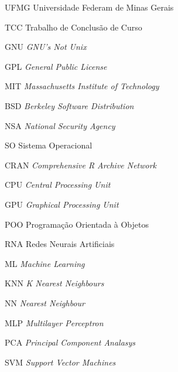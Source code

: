 


\begin{siglas}
	\item[UFMG] Universidade Federam de Minas Gerais
	\item[TCC] Trabalho de Conclusão de Curso
	
	\item[GNU] \textit{GNU's Not Unix}
	\item[GPL] \textit{General Public License }
	\item[MIT] \textit{ Massachusetts Institute of Technology }
	\item[BSD] \textit{Berkeley Software Distribution}
	\item[NSA] \textit{National Security Agency}
	\item[SO] Sistema Operacional
	\item[CRAN] \textit{Comprehensive R Archive Network}
	
	\item[CPU] \textit{Central Processing Unit}
	\item[GPU] \textit{Graphical Processing Unit}
	\item[POO] Programação Orientada à Objetos
	\item[RNA] Redes Neurais Artificiais
	\item[ML] \textit{Machine Learning}
	\item[KNN] \textit{K Nearest Neighbours}
	\item[NN] \textit{Nearest Neighbour}
	\item[MLP]  \textit{Multilayer Perceptron }
	\item[PCA] \textit{Principal Component Analasys}
	\item[SVM]  \textit{Support Vector Machines }
	
	
\end{siglas}



